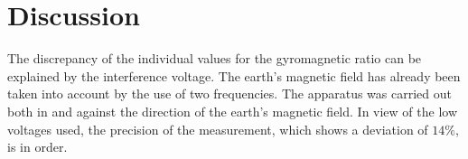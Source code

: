 \section{Discussion}
The discrepancy of the individual values for the gyromagnetic ratio can be explained by the interference
voltage. The earth's magnetic field has already been taken into account by the use of two frequencies.
The apparatus was carried out both in and against the direction of the earth's magnetic field.
In view of the low voltages used, the precision of the measurement, which shows a deviation of $14\%$, is in order.
